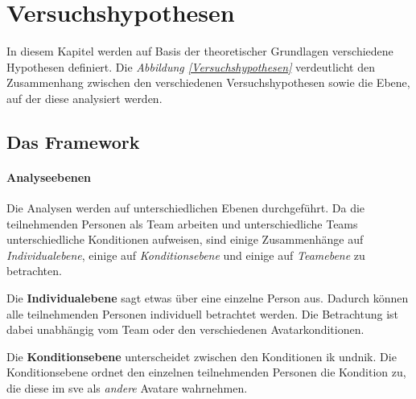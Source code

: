 \documentclass[a4paper,11pt]{article}%
\renewcommand{\\}{\vspace*{0.5\baselineskip} \newline}
\begin{document}


\section{Versuchshypothesen}
In diesem Kapitel werden auf Basis der theoretischer Grundlagen verschiedene Hypothesen definiert.
Die \textit{Abbildung \ref{Versuchshypothesen}} verdeutlicht den Zusammenhang zwischen den verschiedenen Versuchshypothesen sowie die Ebene, auf der diese analysiert werden.
\subsection{Das Framework}

\paragraph{Analyseebenen}
Die Analysen werden auf unterschiedlichen Ebenen durchgeführt.
Da die teilnehmenden Personen als Team arbeiten und unterschiedliche Teams unterschiedliche Konditionen aufweisen, sind einige Zusammenhänge auf \textit{Individualebene}, einige auf \textit{Konditionsebene} und einige auf \textit{Teamebene} zu betrachten.

Die \textbf{Individualebene} sagt etwas über eine einzelne Person aus. Dadurch können alle teilnehmenden Personen individuell betrachtet werden. Die Betrachtung ist dabei unabhängig vom Team oder den verschiedenen Avatarkonditionen. 

Die \textbf{Konditionsebene} unterscheidet zwischen den Konditionen \ac{ik} und\newline \ac{nik}. Die Konditionsebene ordnet den einzelnen teilnehmenden Personen die Kondition zu, die diese im \ac{sve} als \textit{andere} Avatare wahrnehmen. 
\end{document}
